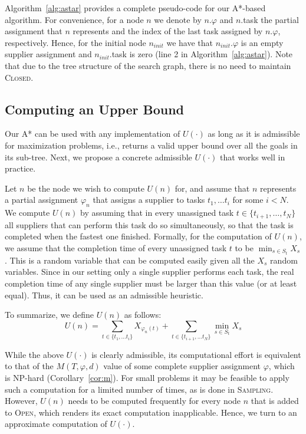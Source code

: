 \documentclass[letterpaper]{article}
\newcommand{\astar}{\textsc{A*}\xspace}
\newcommand{\sampling}{\textsc{Sampling}\xspace}
\newcommand{\closed}{\textsc{Closed}\xspace}
\newcommand{\open}{\textsc{Open}\xspace}
\begin{document}
Algorithm~\ref{alg:astar} provides a complete pseudo-code for our \astar-based algorithm. For convenience, for a node $n$ we denote by $n.\varphi$ and $n$.task
the partial assignment that $n$ represents and the index of the last task assigned by $n.\varphi$, respectively. Hence, for the initial node $n_{init}$ we have that $n_{init}.\varphi$ is an empty supplier assignment and $n_{init}.$task is zero (line 2 in Algorithm~\ref{alg:astar}). Note that due to the tree structure of the search graph, there is no need to maintain \closed.


\subsection{Computing an Upper Bound}

Our \astar can be used with any implementation of $U(\cdot)$ as long as it is admissible for maximization problems, i.e., returns a valid upper bound over all the goals in its sub-tree. Next, we propose a concrete admissible $U(\cdot)$ that works well in practice.

Let $n$ be the node we wish to compute $U(n)$ for, and assume that $n$ represents a partial assignment $\varphi_n$ that assigns a supplier to tasks $t_1,\ldots t_i$ for some $i<N$.
We compute $U(n)$ by assuming that in every unassigned task $t\in \{t_{i+1},\ldots,t_{N}\}$
all suppliers that can perform this task do so simultaneously, so that the task is completed
when the fastest one finished. Formally, for the computation of $U(n)$, we assume that the completion time of every unassigned task $t$ to be $\min_{s\in S_t} X_s$. This is a random variable that can be computed easily given all the $X_s$ random variables. Since in our setting only a single supplier performs each task, the real completion time of any single supplier must be larger than this value (or at least equal). Thus, it can be used as an admissible heuristic.

To summarize, we define $U(n)$ as follows:
\begin{equation}
U(n)=\sum_{t\in \{t_1,\ldots t_i\}} X_{\varphi_n(t)} + \sum_{t\in \{t_{i+1},\ldots t_{N}\}} \min_{s\in S_t} X_s
\label{eq:heuristic}
\end{equation}




While the above $U(\cdot)$ is clearly admissible, its computational effort is equivalent to that of the $M(T,\varphi,d)$ value of some complete supplier assignment $\varphi$, which is NP-hard (Corollary~\ref{cor:m}). For small problems it may be feasible to apply such a computation for a limited number of times, as is done in \sampling. However, $U(n)$ needs to be computed frequently for every node $n$ that is added to \open, which renders its exact computation inapplicable. Hence, we turn to an approximate computation of $U(\cdot)$.
\end{document}
